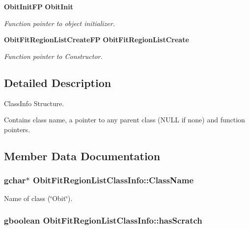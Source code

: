 \begin{CompactItemize}
{\bf Obit\-Init\-FP} {\bf Obit\-Init}
\begin{CompactList}\small\item\em Function pointer to object initializer. \item\end{CompactList}\item 
{\bf Obit\-Fit\-Region\-List\-Create\-FP} {\bf Obit\-Fit\-Region\-List\-Create}
\begin{CompactList}\small\item\em Function pointer to Constructor. \item\end{CompactList}\end{CompactItemize}


\subsection{Detailed Description}
Class\-Info Structure. 

Contains class name, a pointer to any parent class (NULL if none) and function pointers. 



\subsection{Member Data Documentation}
\subsubsection{\setlength{\rightskip}{0pt plus 5cm}gchar$\ast$ {\bf Obit\-Fit\-Region\-List\-Class\-Info::Class\-Name}}\label{structObitFitRegionListClassInfo_o2}


Name of class (\char`\"{}Obit\char`\"{}). 

\subsubsection{\setlength{\rightskip}{0pt plus 5cm}gboolean {\bf Obit\-Fit\-Region\-List\-Class\-Info::has\-Scratch}}\label{structObitFitRegionListClassInfo_o1}


